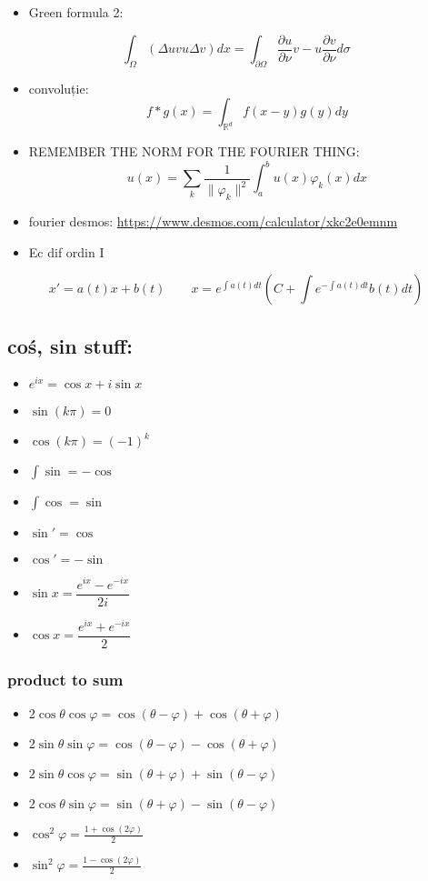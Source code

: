 \documentclass[11pt]{article}
\newcommand{\R}{\mathbb{R}} \newcommand{\C}{\mathbb{C}}
\renewcommand{\phi}{\varphi} \newcommand{\parti}[2]{\frac{\partial #1}{\partial #2}}
\begin{document}
\begin{itemize}
\item Green formula 2:
\end{itemize}
\[ \int_\Omega (\Delta u v u\Delta v) dx = \int_{\partial \Omega} \parti{u}{\nu} v - u \parti{v}{\nu}  d \sigma \]
\begin{itemize}
\item convoluție:
\[ f*g (x) = \int_{\R^d} f(x-y) g(y)dy \]
\item REMEMBER THE NORM FOR THE FOURIER THING:
\[ u(x) = \sum_k \frac{1}{\|\phi_k\|^2} \int_a^b u(x) \phi_k(x) dx \]
\item fourier desmos: \url{https://www.desmos.com/calculator/xkc2e0emnm}

\item Ec dif ordin I
\end{itemize}
\[x' = a(t)x + b(t) \quad \quad x = e^{\int a(t)dt} \left( C + \int e^{-\int a(t) dt} b(t) dt \right)\]
\subsection*{coś, sin stuff:}
\label{sec:orgb80c288}
\begin{itemize}
\item \(e^{ix} = \cos x + i \sin x\)
\item \(\sin (k \pi) = 0\)
\item \(\cos (k \pi) = (-1)^k\)
\item \(\int \sin = - \cos\)
\item \(\int \cos = \sin\)
\item \(\sin' = \cos\)
\item \(\cos' = - \sin\)
\item \(\sin x = \dfrac{e^{ix}-e^{-ix}}{2i}\)
\item \(\cos x = \dfrac{e^{ix}+e^{-ix}}{2}\)
\end{itemize}
\subsubsection*{product to sum}
\label{sec:org44079ad}
\begin{itemize}
\item \(2\cos \theta \cos \varphi = {{\cos(\theta - \varphi) + \cos(\theta + \varphi)}}\)
\item \(2\sin \theta \sin \varphi = {{\cos(\theta - \varphi) - \cos(\theta + \varphi)} }\)
\item \(2\sin \theta \cos \varphi = {{\sin(\theta + \varphi) + \sin(\theta - \varphi)} }\)
\item \(2\cos \theta \sin \varphi = {{\sin(\theta + \varphi) - \sin(\theta - \varphi)} }\)
\item \(\cos^2 \varphi = \frac{1+\cos(2\varphi)}{2}\)
\item \(\sin^2 \varphi = \frac{1-\cos(2\varphi)}{2}\)
\end{itemize}
\end{document}
